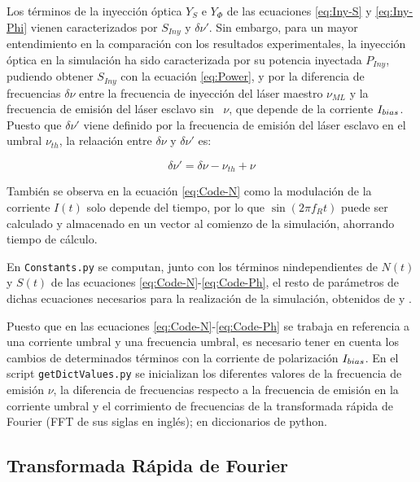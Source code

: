 		Los t\'erminos de la inyecci\'on \'optica $Y_S$ e $Y_{\Phi}$ de las ecuaciones \ref{eq:Iny-S} y \ref{eq:Iny-Phi} vienen caracterizados por $S_{Iny}$ y $\delta\nu'$. Sin embargo, para un mayor entendimiento en la comparaci\'on con los resultados experimentales, la inyecci\'on \'optica en la simulaci\'on ha sido caracterizada por su potencia inyectada $P_{Iny}$, pudiendo obtener $S_{Iny}$ con la ecuaci\'on \ref{eq:Power}, y por la diferencia de frecuencias $\delta\nu$ entre la frecuencia de inyecci\'on del l\'aser maestro $\nu_{ML}$ y la frecuencia de emisi\'on del l\'aser esclavo sin \gs\ $\nu$, que depende de la corriente $I_{bias}$. Puesto que $\delta\nu'$ viene definido por la frecuencia de emisi\'on del l\'aser esclavo en el umbral $\nu_{th}$, la relaación entre $\delta\nu$ y $\delta\nu'$ es:

			\begin{equation}
				\delta\nu' = \delta\nu - \nu_{th} + \nu
			\end{equation}

		Tambi\'en se observa en la ecuaci\'on \ref{eq:Code-N} como la modulaci\'on de la corriente $I(t)$ solo depende del tiempo, por lo que $\sin(2\pi f_R t)$ puede ser calculado y almacenado en un vector al comienzo de la simulaci\'on, ahorrando tiempo de c\'alculo.

		En \texttt{Constants.py} se computan, junto con los t\'erminos nindependientes de $N(t)$ y $S(t)$ de las ecuaciones \ref{eq:Code-N}-\ref{eq:Code-Ph}, el resto de par\'ametros de dichas ecuaciones necesarios para la realizaci\'on de la simulaci\'on, obtenidos de \cite{artSim} y \cite{Chaves19}.

		Puesto que en las ecuaciones \ref{eq:Code-N}-\ref{eq:Code-Ph} se trabaja en referencia a una corriente umbral y una frecuencia umbral, es necesario tener en cuenta los cambios de determinados t\'erminos con la corriente de polarización $I_{bias}$. En el script \texttt{getDictValues.py} se inicializan los diferentes valores de la frecuencia de emisión $\nu$, la diferencia de frecuencias respecto a la frecuencia de emisi\'on en la corriente umbral \cite{Chaves19} y el corrimiento de frecuencias de la transformada r\'apida de Fourier (FFT de sus siglas en ingl\'es); en diccionarios de python.

	\subsection{Transformada R\'apida de Fourier}
		\label{Mdl:Code:FFT}

